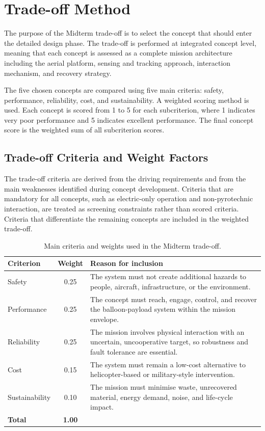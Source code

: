 \chapter{Trade-off Method}
\label{chap:tradeoffmethods}


The purpose of the Midterm trade-off is to select the concept that should enter the detailed design phase. The trade-off is performed at integrated concept level, meaning that each concept is assessed as a complete mission architecture including the aerial platform, sensing and tracking approach, interaction mechanism, and recovery strategy.

The five chosen concepts are compared using five main criteria: safety, performance, reliability, cost, and sustainability. A weighted scoring method is used. Each concept is scored from 1 to 5 for each subcriterion, where 1 indicates very poor performance and 5 indicates excellent performance. The final concept score is the weighted sum of all subcriterion scores. 


\section{Trade-off Criteria and Weight Factors}

The trade-off criteria are derived from the driving requirements and from the main weaknesses identified during concept development. Criteria that are mandatory for all concepts, such as electric-only operation and non-pyrotechnic interaction, are treated as screening constraints rather than scored criteria. Criteria that differentiate the remaining concepts are included in the weighted trade-off.

\begin{table}[H]
\centering
\small
\caption{Main criteria and weights used in the Midterm trade-off.}
\label{tab:main_trade_weights}
\begin{tabularx}{0.92\textwidth}{p{} c X}
\toprule
\textbf{Criterion} & \textbf{Weight} & \textbf{Reason for inclusion} \\
\midrule
Safety & 0.25 & The system must not create additional hazards to people, aircraft, infrastructure, or the environment. \\
Performance & 0.25 & The concept must reach, engage, control, and recover the balloon-payload system within the mission envelope. \\
Reliability & 0.25 & The mission involves physical interaction with an uncertain, uncooperative target, so robustness and fault tolerance are essential. \\
Cost & 0.15 & The system must remain a low-cost alternative to helicopter-based or military-style intervention. \\
Sustainability & 0.10 & The mission must minimise waste, unrecovered material, energy demand, noise, and life-cycle impact. \\
\midrule
\textbf{Total} & \textbf{1.00} & \\
\bottomrule
\end{tabularx}
\end{table}

